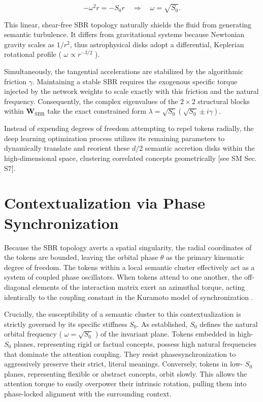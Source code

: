\documentclass[10pt]{article}
\begin{document}
\begin{equation}
-\omega^{2} r=-S_{0} r \quad \Longrightarrow \quad \omega=\sqrt{S_{0}} .
\end{equation}


This linear, shear-free SBR topology naturally shields the fluid from generating semantic turbulence. It differs from gravitational systems because Newtonian gravity scales as $1 / r^{2}$, thus astrophysical disks adopt a differential, Keplerian rotational profile ( $\omega \propto r^{-3 / 2}$ ).

Simultaneously, the tangential accelerations are stabilized by the algorithmic friction $\gamma$. Maintaining a stable SBR requires the exogenous specific torque injected by the network weights to scale exactly with this friction and the natural frequency. Consequently, the complex eigenvalues of the $2 \times 2$ structural blocks within $\mathbf{W}_{\mathrm{SBR}}$ take the exact constrained form $\lambda=\sqrt{S_{0}}\left(\sqrt{S_{0}} \pm i \gamma\right)$.

Instead of expending degrees of freedom attempting to repel tokens radially, the deep learning optimization process utilizes its remaining parameters to dynamically translate and reorient these $d / 2$ semantic accretion disks within the high-dimensional space, clustering correlated concepts geometrically [see SM Sec. S7].

\section{Contextualization via Phase Synchronization}

Because the SBR topology averts a spatial singularity, the radial coordinates of the tokens are bounded, leaving the orbital phase $\theta$ as the primary kinematic degree of freedom. The tokens within a local semantic cluster effectively act as a system of coupled phase oscillators. When tokens attend to one another, the off-diagonal elements of the interaction matrix exert an azimuthal torque, acting identically to the coupling constant in the Kuramoto model of synchronization \cite{ref18,ref19}.

Crucially, the susceptibility of a semantic cluster to this contextualization is strictly governed by its specific stiffness $S_{0}$. As established, $S_{0}$ defines the natural orbital frequency ( $\omega=\sqrt{S_{0}}$ ) of the invariant plane. Tokens embedded in high- $S_{0}$ planes, representing rigid or factual concepts, possess high natural frequencies that dominate the attention coupling. They resist phasesynchronization to aggressively preserve their strict, literal meanings. Conversely, tokens in low- $S_{0}$ planes, representing flexible or abstract concepts, orbit slowly. This allows the attention torque to easily overpower their intrinsic rotation, pulling them into phase-locked alignment with the surrounding context.
\end{document}
